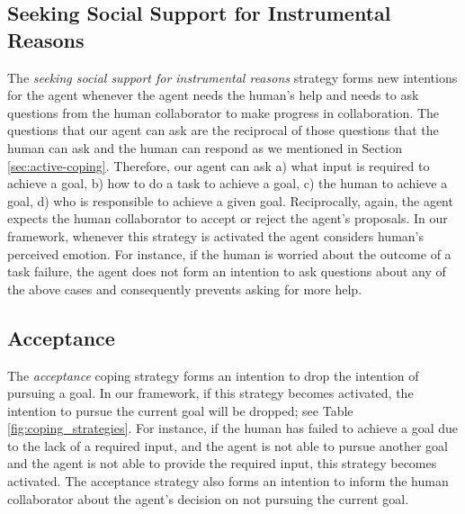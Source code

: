 \documentclass[12pt]{report}
\begin{document}
\subsection{Seeking Social Support for Instrumental Reasons}
The \textit{seeking social support for instrumental reasons} strategy forms new
intentions for the agent whenever the agent needs the human's help and needs to
ask questions from the human collaborator to make progress in collaboration. The
questions that our agent can ask are the reciprocal of those questions that the
human can ask and the human can respond as we mentioned in Section
\ref{sec:active-coping}. Therefore, our agent can ask a) what input is required
to achieve a goal, b) how to do a task to achieve a goal, c) the human to
achieve a goal, d) who is responsible to achieve a given goal. Reciprocally,
again, the agent expects the human collaborator to accept or reject the agent's
proposals. In our framework, whenever this strategy is activated the agent
considers human's perceived emotion. For instance, if the human is worried about
the outcome of a task failure, the agent does not form an intention to ask
questions about any of the above cases and consequently prevents asking for more
help.

\subsection{Acceptance}
The \textit{acceptance} coping strategy forms an intention to drop the
intention of pursuing a goal. In our framework, if this strategy becomes
activated, the intention to pursue the current goal will be dropped; see Table
\ref{fig:coping_strategies}. For instance, if the human has failed
to achieve a goal due to the lack of a required input, and the agent is not able to pursue
another goal and the agent is not able to provide the required input, this
strategy becomes activated. The acceptance strategy also forms an intention to
inform the human collaborator about the agent's decision on not pursuing the
current goal.
\end{document}
